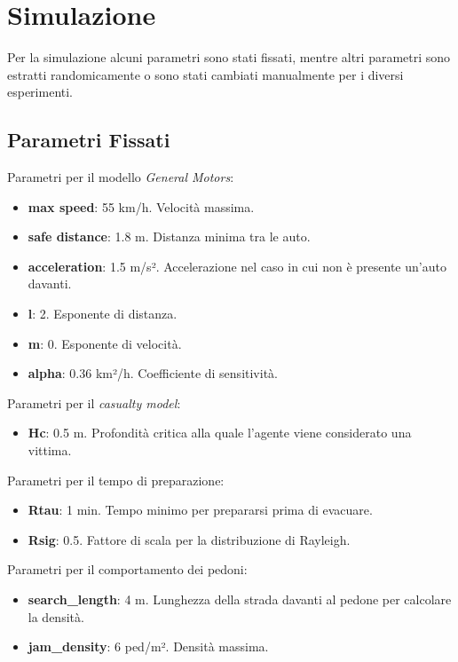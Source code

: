 \section{Simulazione}
\label{sec:simulazione}
Per la simulazione alcuni parametri sono stati fissati, mentre altri parametri sono estratti randomicamente 
o sono stati cambiati manualmente per i diversi esperimenti.

\subsection{Parametri Fissati}
\label{ssec:parametri-fissi}

Parametri per il modello \textit{General Motors}:
\begin{itemize}
    \item \textbf{max speed}: 55 km/h. Velocità massima.
    \item \textbf{safe distance}: 1.8 m. Distanza minima tra le auto.
    \item \textbf{acceleration}: 1.5 m/s². Accelerazione nel caso in cui non è presente un'auto davanti.
    \item \textbf{l}: 2. Esponente di distanza.
    \item \textbf{m}: 0. Esponente di velocità.
    \item \textbf{alpha}: 0.36 km²/h. Coefficiente di sensitività. 
\end{itemize}

\noindent
Parametri per il \textit{casualty model}:
\begin{itemize}
  \item \textbf{Hc}: 0.5 m. Profondità critica alla quale l'agente viene considerato una vittima.
\end{itemize}

\noindent
Parametri per il tempo di preparazione:
\begin{itemize}
  \item \textbf{Rtau}: 1 min. Tempo minimo per prepararsi prima di evacuare.
  \item \textbf{Rsig}: 0.5. Fattore di scala per la distribuzione di Rayleigh.
\end{itemize}

\noindent
Parametri per il comportamento dei pedoni:
\begin{itemize}
  \item \textbf{search\_length}: 4 m. Lunghezza della strada davanti al pedone per calcolare la densità.
  \item \textbf{jam\_density}: 6 ped/m². Densità massima.
\end{itemize}

